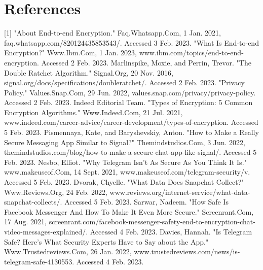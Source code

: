 \documentclass[11pt]{article}
\theoremstyle{plain}
\theoremstyle{definition}
\begin{document}
\section{References}
[1] "About End-to-end Encryption." Faq.Whatsapp.Com, 1 Jan. 2021, faq.whatsapp.com/820124435853543/. Accessed 3 Feb. 2023. \newline \newline
[2] "What Is End-to-end Encryption?" Www.Ibm.Com, 1 Jan. 2023, www.ibm.com/topics/end-to-end-encryption. Accessed 2 Feb. 2023. \newline \newline
[3] Marlinspike, Moxie, and Perrin, Trevor. "The Double Ratchet Algorithm." Signal.Org, 20 Nov. 2016, signal.org/docs/specifications/doubleratchet/. Accessed 2 Feb. 2023. \newline \newline
[4] "Privacy Policy." Values.Snap.Com, 29 Jun. 2022, values.snap.com/privacy/privacy-policy. Accessed 2 Feb. 2023. \newline \newline
[5] Indeed Editorial Team. "Types of Encryption: 5 Common Encryption Algorithms." Www.Indeed.Com, 21 Jul. 2021, www.indeed.com/career-advice/career-development/types-of-encryption. Accessed 5 Feb. 2023. \newline \newline
[6] Pismennaya, Kate, and Baryshevskiy, Anton. "How to Make a Really Secure Messaging App Similar to Signal?" Themindstudios.Com, 3 Jun. 2022, themindstudios.com/blog/how-to-make-a-secure-chat-app-like-signal/. Accessed 5 Feb. 2023. \newline \newline
[7] Nesbo, Elliot. "Why Telegram Isn't As Secure As You Think It Is." www.makeuseof.Com, 14 Sept. 2021, www.makeuseof.com/telegram-security/v. Accessed 5 Feb. 2023. \newline \newline
[8] Dvorak, Chyelle. "What Data Does Snapchat Collect?" Www.Reviews.Org, 24 Feb. 2022, www.reviews.org/internet-service/what-data-snapchat-collects/. Accessed 5 Feb. 2023. \newline \newline
[9] Sarwar, Nadeem. "How Safe Is Facebook Messenger And How To Make It Even More Secure." Screenrant.Com, 17 Aug. 2021, screenrant.com/facebook-messenger-safety-end-to-encryption-chat-video-messages-explained/. Accessed 4 Feb. 2023. \newline \newline
[10] Davies, Hannah. "Is Telegram Safe? Here’s What Security Experts Have to Say about the App." Www.Trustedreviews.Com, 26 Jan. 2022, www.trustedreviews.com/news/is-telegram-safe-4130553. Accessed 4 Feb. 2023. \newline
\end{document}
